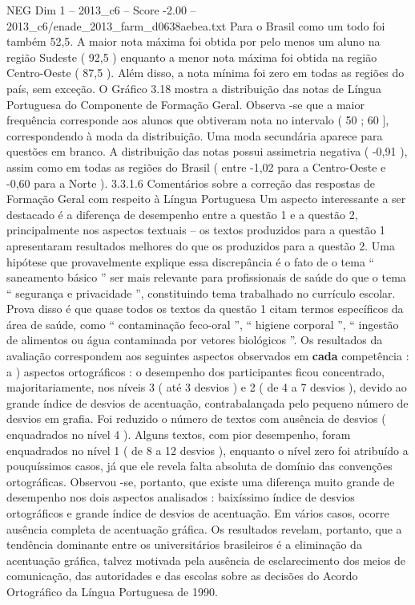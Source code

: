 \begin{textsample}{NEG Dim 1 – 2013\_c6 – Score -2.00 – 2013\_c6/enade\_2013\_farm\_d0638aebea.txt}
Para o Brasil como um todo foi também 52,5.
A maior nota máxima foi obtida por pelo menos um aluno na região Sudeste ( 92,5 ) enquanto a menor nota máxima foi obtida na região Centro-Oeste ( 87,5 ).
Além disso, a nota mínima foi zero em todas as regiões do país, sem exceção.
O Gráfico 3.18 mostra a distribuição das notas de Língua Portuguesa do Componente de Formação Geral.
Observa -se que a maior frequência corresponde aos alunos que obtiveram nota no intervalo ( 50 ; 60 ], correspondendo à moda da distribuição.
Uma moda secundária aparece para questões em branco.
A distribuição das notas possui assimetria negativa ( -0,91 ), assim como em todas as regiões do Brasil ( entre -1,02 para a Centro-Oeste e -0,60 para a Norte ). 3.3.1.6 Comentários sobre a correção das respostas de Formação Geral com respeito à Língua Portuguesa Um aspecto interessante a ser destacado é a diferença de desempenho entre a questão 1 e a questão 2, principalmente nos aspectos textuais – os textos produzidos para a questão 1 apresentaram resultados melhores do que os produzidos para a questão 2.
Uma hipótese que provavelmente explique essa discrepância é o fato de o tema “ saneamento básico ” ser mais relevante para profissionais de saúde do que o tema “ segurança e privacidade ”, constituindo tema trabalhado no currículo escolar.
Prova disso é que quase todos os textos da questão 1 citam termos específicos da área de saúde, como “ contaminação feco-oral ”, “ higiene corporal ”, “ ingestão de alimentos ou água contaminada por vetores biológicos ”.
Os resultados da avaliação correspondem aos seguintes aspectos observados em \textbf{cada} competência : a ) aspectos ortográficos : o desempenho dos participantes ficou concentrado, majoritariamente, nos níveis 3 ( até 3 desvios ) e 2 ( de 4 a 7 desvios ), devido ao grande índice de desvios de acentuação, contrabalançada pelo pequeno número de desvios em grafia.
Foi reduzido o número de textos com ausência de desvios ( enquadrados no nível 4 ).
Alguns textos, com pior desempenho, foram enquadrados no nível 1 ( de 8 a 12 desvios ), enquanto o nível zero foi atribuído a pouquíssimos casos, já que ele revela falta absoluta de domínio das convenções ortográficas.
Observou -se, portanto, que existe uma diferença muito grande de desempenho nos dois aspectos analisados : baixíssimo índice de desvios ortográficos e grande índice de desvios de acentuação.
Em vários casos, ocorre ausência completa de acentuação gráfica.
Os resultados revelam, portanto, que a tendência dominante entre os universitários brasileiros é a eliminação da acentuação gráfica, talvez motivada pela ausência de esclarecimento dos meios de comunicação, das autoridades e das escolas sobre as decisões do Acordo Ortográfico da Língua Portuguesa de 1990.

\end{textsample}
